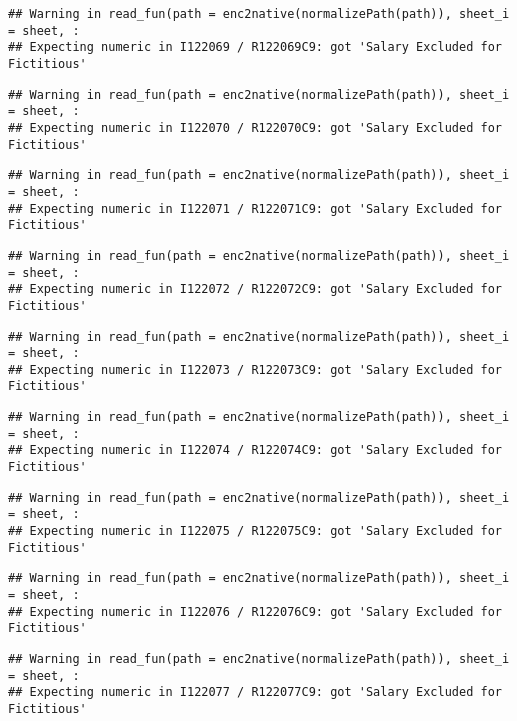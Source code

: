 \documentclass[
]{article}
\begin{document}
\begin{verbatim}
## Warning in read_fun(path = enc2native(normalizePath(path)), sheet_i = sheet, :
## Expecting numeric in I122069 / R122069C9: got 'Salary Excluded for Fictitious'
\end{verbatim}

\begin{verbatim}
## Warning in read_fun(path = enc2native(normalizePath(path)), sheet_i = sheet, :
## Expecting numeric in I122070 / R122070C9: got 'Salary Excluded for Fictitious'
\end{verbatim}

\begin{verbatim}
## Warning in read_fun(path = enc2native(normalizePath(path)), sheet_i = sheet, :
## Expecting numeric in I122071 / R122071C9: got 'Salary Excluded for Fictitious'
\end{verbatim}

\begin{verbatim}
## Warning in read_fun(path = enc2native(normalizePath(path)), sheet_i = sheet, :
## Expecting numeric in I122072 / R122072C9: got 'Salary Excluded for Fictitious'
\end{verbatim}

\begin{verbatim}
## Warning in read_fun(path = enc2native(normalizePath(path)), sheet_i = sheet, :
## Expecting numeric in I122073 / R122073C9: got 'Salary Excluded for Fictitious'
\end{verbatim}

\begin{verbatim}
## Warning in read_fun(path = enc2native(normalizePath(path)), sheet_i = sheet, :
## Expecting numeric in I122074 / R122074C9: got 'Salary Excluded for Fictitious'
\end{verbatim}

\begin{verbatim}
## Warning in read_fun(path = enc2native(normalizePath(path)), sheet_i = sheet, :
## Expecting numeric in I122075 / R122075C9: got 'Salary Excluded for Fictitious'
\end{verbatim}

\begin{verbatim}
## Warning in read_fun(path = enc2native(normalizePath(path)), sheet_i = sheet, :
## Expecting numeric in I122076 / R122076C9: got 'Salary Excluded for Fictitious'
\end{verbatim}

\begin{verbatim}
## Warning in read_fun(path = enc2native(normalizePath(path)), sheet_i = sheet, :
## Expecting numeric in I122077 / R122077C9: got 'Salary Excluded for Fictitious'
\end{verbatim}
\end{document}
